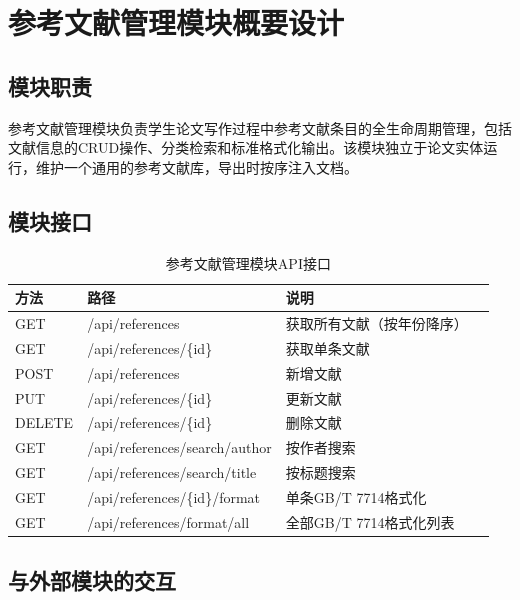 
\section{参考文献管理模块概要设计}

\subsection{模块职责}

参考文献管理模块负责学生论文写作过程中参考文献条目的全生命周期管理，包括文献信息的CRUD操作、分类检索和标准格式化输出。该模块独立于论文实体运行，维护一个通用的参考文献库，导出时按序注入文档。

\subsection{模块接口}

\begin{table}[htbp]
\centering
\caption{参考文献管理模块API接口}
\label{tab:ref_api}
\begin{tabular}{lllp{5cm}}
\toprule
\textbf{方法} & \textbf{路径} & \textbf{说明} \\
\midrule
GET    & /api/references       & 获取所有文献（按年份降序） \\
GET    & /api/references/\{id\} & 获取单条文献 \\
POST   & /api/references       & 新增文献 \\
PUT    & /api/references/\{id\} & 更新文献 \\
DELETE & /api/references/\{id\} & 删除文献 \\
GET    & /api/references/search/author & 按作者搜索 \\
GET    & /api/references/search/title  & 按标题搜索 \\
GET    & /api/references/\{id\}/format & 单条GB/T 7714格式化 \\
GET    & /api/references/format/all   & 全部GB/T 7714格式化列表 \\
\bottomrule
\end{tabular}
\end{table}

\subsection{与外部模块的交互}

